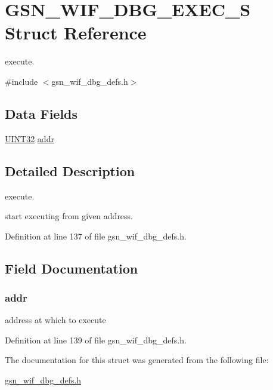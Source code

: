 \hypertarget{a00326}{
\section{GSN\_\-WIF\_\-DBG\_\-EXEC\_\-S Struct Reference}
\label{a00326}
}


execute.  




{\ttfamily \#include $<$gsn\_\-wif\_\-dbg\_\-defs.h$>$}

\subsection*{Data Fields}
\begin{DoxyCompactItemize}
\item 
\hyperlink{a00660_gae1e6edbbc26d6fbc71a90190d0266018}{UINT32} \hyperlink{a00326_a211571ed47a0fee2d898236395234dab}{addr}
\end{DoxyCompactItemize}


\subsection{Detailed Description}
execute. 

start executing from given address. 

Definition at line 137 of file gsn\_\-wif\_\-dbg\_\-defs.h.



\subsection{Field Documentation}
\hypertarget{a00326_a211571ed47a0fee2d898236395234dab}{
\subsubsection[{addr}]{ {\bf addr}}}
\label{a00326_a211571ed47a0fee2d898236395234dab}
address at which to execute 

Definition at line 139 of file gsn\_\-wif\_\-dbg\_\-defs.h.



The documentation for this struct was generated from the following file:\begin{DoxyCompactItemize}
\item 
\hyperlink{a00609}{gsn\_\-wif\_\-dbg\_\-defs.h}\end{DoxyCompactItemize}
